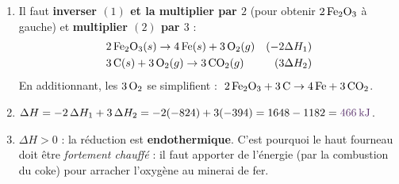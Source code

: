 \documentclass[11pt,a4paper]{article}
\newcommand{\dH}{\Delta H}
\newcommand{\rep}[1]{\textcolor{primarydark}{\textbf{#1}}}
\begin{document}
\begin{correction}
\begin{enumerate}[label=\alph*),leftmargin=2em,topsep=2pt,itemsep=3pt]
  \item Il faut \textbf{inverser $(1)$ et la multiplier par $2$} (pour obtenir $2\,\ce{Fe2O3}$ à gauche)
        et \textbf{multiplier $(2)$ par $3$} :
  \begin{align*}
    &2\,\ce{Fe2O3}(s) \rightarrow 4\,\ce{Fe}(s) + 3\,\ce{O2}(g) & (-2\dH_1)\\
    &3\,\ce{C}(s) + 3\,\ce{O2}(g) \rightarrow 3\,\ce{CO2}(g) & (3\dH_2)
  \end{align*}
  En additionnant, les $3\,\ce{O2}$ se simplifient : $\;2\,\ce{Fe2O3} + 3\,\ce{C} \rightarrow 4\,\ce{Fe} + 3\,\ce{CO2}$. \checkmark
  \item $\dH = -2\,\dH_1 + 3\,\dH_2 = -2(-824) + 3(-394) = 1648 - 1182 = \rep{\SI{+466}{\kilo\joule}}$.
  \item $\dH>0$ : la réduction est \rep{endothermique}. C'est pourquoi le haut fourneau doit être
        \emph{fortement chauffé} : il faut apporter de l'énergie (par la combustion du coke) pour
        arracher l'oxygène au minerai de fer.
\end{enumerate}
\end{correction}
\end{document}
